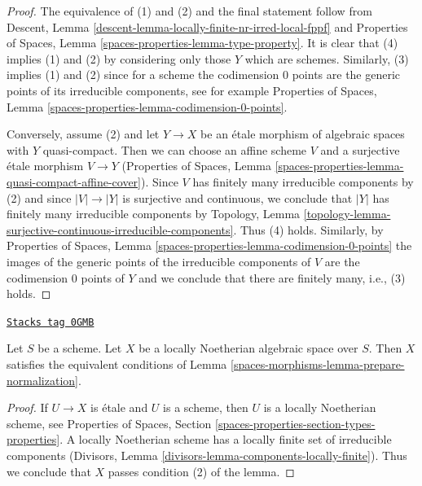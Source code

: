 \begin{proof}
The equivalence of (1) and (2) and the final statement follow from
Descent, Lemma \ref{descent-lemma-locally-finite-nr-irred-local-fppf} and
Properties of Spaces, Lemma \ref{spaces-properties-lemma-type-property}.
It is clear that (4) implies (1) and (2) by considering only those $Y$
which are schemes. Similarly, (3) implies (1) and (2) since for a scheme
the codimension $0$ points are the generic points of its
irreducible components, see for example
Properties of Spaces, Lemma \ref{spaces-properties-lemma-codimension-0-points}.

\medskip\noindent
Conversely, assume (2) and let $Y \to X$ be an \'etale morphism of
algebraic spaces with $Y$ quasi-compact. Then we can choose an affine
scheme $V$ and a surjective \'etale morphism $V \to Y$
(Properties of Spaces, Lemma
\ref{spaces-properties-lemma-quasi-compact-affine-cover}).
Since $V$ has finitely many irreducible components by (2) and since
$|V| \to |Y|$ is surjective and continuous, we conclude that
$|Y|$ has finitely many irreducible components by Topology, Lemma
\ref{topology-lemma-surjective-continuous-irreducible-components}.
Thus (4) holds. Similarly, by
Properties of Spaces, Lemma \ref{spaces-properties-lemma-codimension-0-points}
the images of the generic points of the irreducible components of $V$
are the codimension $0$ points of $Y$ and we conclude that there are
finitely many, i.e., (3) holds.
\end{proof}

\begin{lemma}
\label{spaces-morphisms-lemma-locally-noetherian-can-be-normalized}
\href{https://stacks.math.columbia.edu/tag/0GMB}{\texttt{Stacks tag 0GMB}}

Let $S$ be a scheme. Let $X$ be a locally Noetherian algebraic space
over $S$. Then $X$ satisfies the equivalent conditions of
Lemma \ref{spaces-morphisms-lemma-prepare-normalization}.
\end{lemma}

\begin{proof}
If $U \to X$ is \'etale and $U$ is a scheme, then $U$ is a locally Noetherian
scheme, see Properties of Spaces, Section
\ref{spaces-properties-section-types-properties}.
A locally Noetherian scheme has a locally finite set of irreducible
components (Divisors, Lemma \ref{divisors-lemma-components-locally-finite}).
Thus we conclude that $X$ passes condition (2) of the lemma.
\end{proof}

